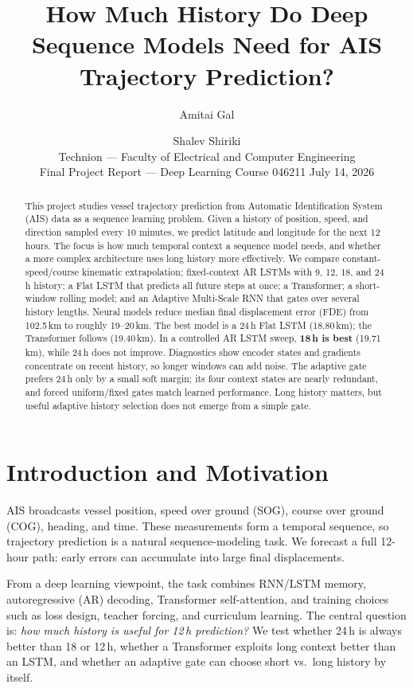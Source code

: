 \documentclass[11pt,a4paper]{article}
\title{\vspace{-1.2em}How Much History Do Deep Sequence Models Need for AIS Trajectory Prediction?}
\author{Amitai Gal \and Shalev Shiriki\\[2pt]
{\normalsize Technion --- Faculty of Electrical and Computer Engineering}\\[2pt]
{\normalsize Final Project Report --- Deep Learning Course 046211 \quad July 14, 2026}}
\date{}
\begin{document}
\maketitle
\vspace{-1.4em}

\begin{abstract}
\vspace{-0.3em}
This project studies vessel trajectory prediction from Automatic Identification System (AIS) data as a sequence learning problem. Given a history of position, speed, and direction sampled every 10 minutes, we predict latitude and longitude for the next 12 hours. The focus is how much temporal context a sequence model needs, and whether a more complex architecture uses long history more effectively.
We compare constant-speed/course kinematic extrapolation; fixed-context AR LSTMs with 9, 12, 18, and 24\,h history; a Flat LSTM that predicts all future steps at once; a Transformer; a short-window rolling model; and an Adaptive Multi-Scale RNN that gates over several history lengths. Neural models reduce median final displacement error (FDE) from 102.5\,km to roughly 19--20\,km. The best model is a 24\,h Flat LSTM (18.80\,km); the Transformer follows (19.40\,km). In a controlled AR LSTM sweep, \textbf{18\,h is best} (19.71\,km), while 24\,h does not improve. Diagnostics show encoder states and gradients concentrate on recent history, so longer windows can add noise. The adaptive gate prefers 24\,h only by a small soft margin; its four context states are nearly redundant, and forced uniform/fixed gates match learned performance. Long history matters, but useful adaptive history selection does not emerge from a simple gate.
\end{abstract}
\vspace{-0.5em}

\section{Introduction and Motivation}
\vspace{-0.25em}
AIS broadcasts vessel position, speed over ground (SOG), course over ground (COG), heading, and time. These measurements form a temporal sequence, so trajectory prediction is a natural sequence-modeling task. We forecast a full 12-hour path: early errors can accumulate into large final displacements.

From a deep learning viewpoint, the task combines RNN/LSTM memory, autoregressive (AR) decoding, Transformer self-attention, and training choices such as loss design, teacher forcing, and curriculum learning. The central question is: \emph{how much history is useful for 12\,h prediction?} We test whether 24\,h is always better than 18 or 12\,h, whether a Transformer exploits long context better than an LSTM, and whether an adaptive gate can choose short vs.\ long history by itself.
\end{document}
